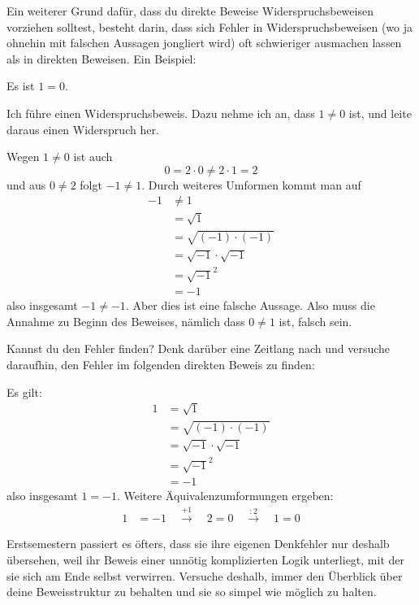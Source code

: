   
\begin{bsp}[*]
    Ein weiterer Grund dafür, dass du direkte Beweise Widerspruchsbeweisen vorziehen solltest, besteht darin, dass sich Fehler in Widerspruchsbeweisen (wo ja ohnehin mit falschen Aussagen jongliert wird) oft schwieriger ausmachen lassen als in direkten Beweisen. Ein Beispiel:
    \begin{satz}
        Es ist $1=0$.
    \end{satz}
    \begin{bew}
        Ich führe einen Widerspruchsbeweis. Dazu nehme ich an, dass $1\neq 0$ ist, und leite daraus einen Widerspruch her.
        
        Wegen $1\neq 0$ ist auch
            \[ 0 = 2\cdot 0 \neq 2\cdot 1 = 2 \]
        und aus $0\neq 2$ folgt $-1\neq 1$. Durch weiteres Umformen kommt man auf
        \begin{align*}
            -1 & \neq 1 \\
            & = \sqrt{1} \\
            & = \sqrt{(-1)\cdot (-1)} \\
            & = \sqrt{-1} \cdot \sqrt{-1} \\
            & = \sqrt{-1}^2 \\
            & = -1
        \end{align*}
        also insgesamt $-1\neq -1$. Aber dies ist eine falsche Aussage. Also muss die Annahme zu Beginn des Beweises, nämlich dass $0\neq 1$ ist, falsch sein. 
    \end{bew}
    Kannst du den Fehler finden? Denk darüber eine Zeitlang nach und versuche daraufhin, den Fehler im folgenden direkten Beweis  zu finden:
    \begin{bew}
        Es gilt:
        \begin{align*}
            1 & = \sqrt{1} \\
            & = \sqrt{(-1)\cdot (-1)} \\
            & = \sqrt{-1}\cdot \sqrt{-1} \\
            & = \sqrt{-1}^2 \\
            & = -1
        \end{align*}
        also insgesamt $1=-1$. Weitere Äquivalenzumformungen ergeben:
        \begin{align*}
            1 & = -1 \quad\xrightarrow{+1}\quad 2=0 \quad\xrightarrow{:2}\quad 1=0 
        \end{align*}
    \end{bew}
    Erstsemestern passiert es öfters, dass sie ihre eigenen Denkfehler nur deshalb übersehen, weil ihr Beweis einer unnötig komplizierten Logik unterliegt, mit der sie sich am Ende selbst verwirren. Versuche deshalb, immer den Überblick über deine Beweisstruktur zu behalten und sie so simpel wie möglich zu halten.
\end{bsp}


